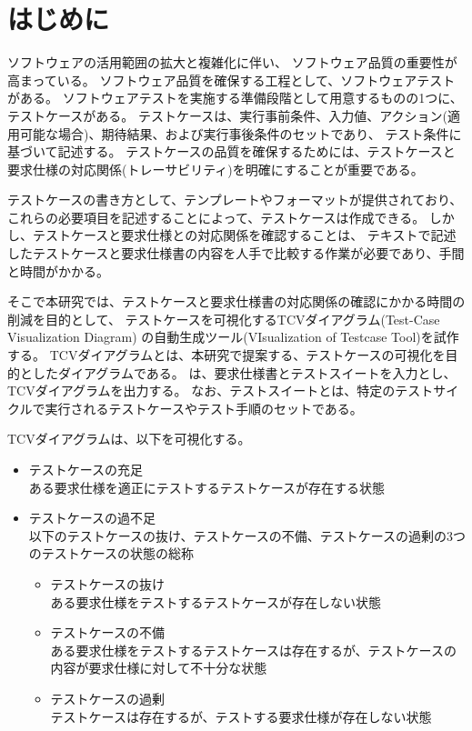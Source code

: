 \chapter{はじめに}\label{cha:Introduction}

ソフトウェアの活用範囲の拡大と複雑化に伴い、
ソフトウェア品質の重要性が高まっている\cite{BBC}。
ソフトウェア品質を確保する工程として、ソフトウェアテストがある。
ソフトウェアテストを実施する準備段階として用意するものの1つに、テストケースがある\cite{jstqb_syllabus}。
テストケースは、実行事前条件、入力値、アクション(適用可能な場合)、期待結果、および実行事後条件のセットであり、
テスト条件に基づいて記述する\cite{istqb_glossary}。
テストケースの品質を確保するためには、テストケースと要求仕様の対応関係(トレーサビリティ)を明確にすることが重要である\cite{jstqb_syllabus}。

テストケースの書き方として、テンプレートやフォーマットが提供されており\cite{shift_testcase}\cite{minna_testcase}、
これらの必要項目を記述することによって、テストケースは作成できる。
しかし、テストケースと要求仕様との対応関係を確認することは、
テキストで記述したテストケースと要求仕様書の内容を人手で比較する作業が必要であり、手間と時間がかかる。

そこで本研究では、テストケースと要求仕様書の対応関係の確認にかかる時間の削減を目的として、
テストケースを可視化するTCVダイアグラム(Test-Case Visualization Diagram)
の自動生成ツール\tool{}(VIsualization of Testcase Tool)を試作する。
TCVダイアグラムとは、本研究で提案する、テストケースの可視化を目的としたダイアグラムである。
\tool{}は、要求仕様書とテストスイートを入力とし、
TCVダイアグラムを出力する。
なお、テストスイートとは、特定のテストサイクルで実行されるテストケースやテスト手順のセットである\cite{istqb_glossary}。

TCVダイアグラムは、以下を可視化する。

\begin{itemize}
    \item テストケースの充足\\
    ある要求仕様を適正にテストするテストケースが存在する状態
    \item テストケースの過不足\\
    以下のテストケースの抜け、テストケースの不備、テストケースの過剰の3つのテストケースの状態の総称
    \begin{itemize}
        \item テストケースの抜け\\
        ある要求仕様をテストするテストケースが存在しない状態
        \item テストケースの不備\\
        ある要求仕様をテストするテストケースは存在するが、テストケースの内容が要求仕様に対して不十分な状態
        \item テストケースの過剰\\
        テストケースは存在するが、テストする要求仕様が存在しない状態
    \end{itemize}
\end{itemize}

